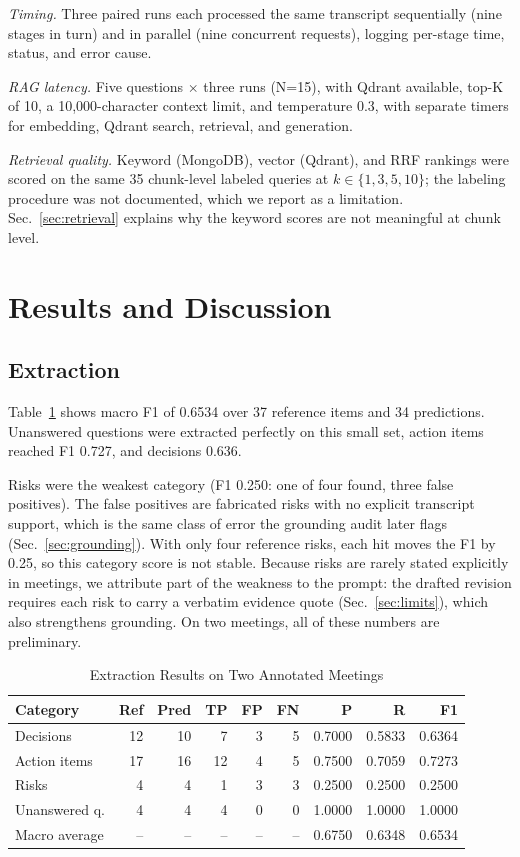 \documentclass[conference]{IEEEtran}
\begin{document}
\emph{Timing.} Three paired runs each processed the same transcript sequentially (nine stages in turn) and in parallel (nine concurrent requests), logging per-stage time, status, and error cause.

\emph{RAG latency.} Five questions $\times$ three runs (N=15), with Qdrant available, top-K of 10, a 10,000-character context limit, and temperature 0.3, with separate timers for embedding, Qdrant search, retrieval, and generation.

\emph{Retrieval quality.} Keyword (MongoDB), vector (Qdrant), and RRF rankings were scored on the same 35 chunk-level labeled queries at $k\in\{1,3,5,10\}$; the labeling procedure was not documented, which we report as a limitation. Sec.~\ref{sec:retrieval} explains why the keyword scores are not meaningful at chunk level.

\section{Results and Discussion}
\subsection{Extraction}
Table~\ref{tab:extraction} shows macro F1 of 0.6534 over 37 reference items and 34 predictions. Unanswered questions were extracted perfectly on this small set, action items reached F1 0.727, and decisions 0.636.

Risks were the weakest category (F1 0.250: one of four found, three false positives). The false positives are fabricated risks with no explicit transcript support, which is the same class of error the grounding audit later flags (Sec.~\ref{sec:grounding}). With only four reference risks, each hit moves the F1 by 0.25, so this category score is not stable. Because risks are rarely stated explicitly in meetings, we attribute part of the weakness to the prompt: the drafted revision requires each risk to carry a verbatim evidence quote (Sec.~\ref{sec:limits}), which also strengthens grounding. On two meetings, all of these numbers are preliminary.

\begin{table}[!t]
\caption{Extraction Results on Two Annotated Meetings}
\label{tab:extraction}
\centering
\footnotesize
\setlength{\tabcolsep}{3.4pt}
\renewcommand{\arraystretch}{1.05}
\begin{tabular}{lrrrrrrrr}
\toprule
\textbf{Category} & \textbf{Ref} & \textbf{Pred} & \textbf{TP} & \textbf{FP} & \textbf{FN} & \textbf{P} & \textbf{R} & \textbf{F1}\\
\midrule
Decisions & 12 & 10 & 7 & 3 & 5 & 0.7000 & 0.5833 & 0.6364\\
Action items & 17 & 16 & 12 & 4 & 5 & 0.7500 & 0.7059 & 0.7273\\
Risks & 4 & 4 & 1 & 3 & 3 & 0.2500 & 0.2500 & 0.2500\\
Unanswered q. & 4 & 4 & 4 & 0 & 0 & 1.0000 & 1.0000 & 1.0000\\
\midrule
Macro average & -- & -- & -- & -- & -- & 0.6750 & 0.6348 & 0.6534\\
\bottomrule
\end{tabular}
\end{table}
\end{document}
